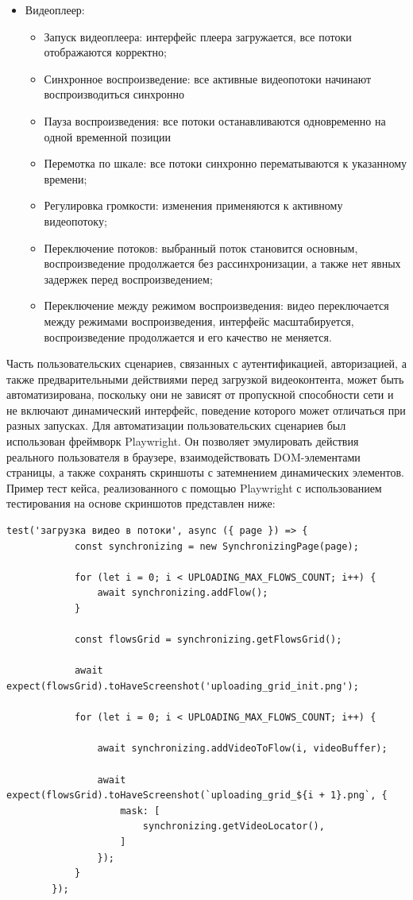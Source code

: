 \begin{itemize}[label=$\bullet$]
\begin{itemize}[label=$\circ$]
		\end{itemize}
		\item Видеоплеер:
		\begin{itemize}[label=$\circ$]
			\item Запуск видеоплеера: интерфейс плеера загружается, все потоки отображаются корректно;
			\item Синхронное воспроизведение: все активные видеопотоки начинают воспроизводиться синхронно
			\item Пауза воспроизведения: все потоки останавливаются одновременно на одной временной позиции
			\item Перемотка по шкале: все потоки синхронно перематываются к указанному времени;
			\item Регулировка громкости: изменения применяются к активному видеопотоку;
			\item Переключение потоков: выбранный поток становится основным, воспроизведение продолжается без рассинхронизации, а также нет явных задержек перед воспроизведением;
			\item Переключение между режимом воспроизведения: видео переключается между режимами воспроизведения, интерфейс масштабируется, воспроизведение продолжается и его качество не меняется.
		\end{itemize}
	\end{itemize}

	Часть пользовательских сценариев, связанных с аутентификацией, авторизацией, а также предварительными действиями перед загрузкой видеоконтента, может быть автоматизирована, поскольку они не зависят от пропускной способности сети и не включают динамический интерфейс, поведение которого может отличаться при разных запусках. Для автоматизации пользовательских сценариев был использован фреймворк Playwright. Он позволяет эмулировать действия реального пользователя в браузере, взаимодействовать DOM-элементами страницы, а также сохранять скриншоты с затемнением динамических элементов. Пример тест кейса, реализованного с помощью Playwright с использованием тестирования на основе скриншотов представлен ниже:

	\begin{lstlisting}[caption={Пример тест-кейса, реализованного с помощью Playwright}]
		test('загрузка видео в потоки', async ({ page }) => {
			const synchronizing = new SynchronizingPage(page);
			
			for (let i = 0; i < UPLOADING_MAX_FLOWS_COUNT; i++) {
				await synchronizing.addFlow();
			}
			
			const flowsGrid = synchronizing.getFlowsGrid();
			
			await expect(flowsGrid).toHaveScreenshot('uploading_grid_init.png');
			
			for (let i = 0; i < UPLOADING_MAX_FLOWS_COUNT; i++) {
				
				await synchronizing.addVideoToFlow(i, videoBuffer);
				
				await expect(flowsGrid).toHaveScreenshot(`uploading_grid_${i + 1}.png`, {
					mask: [
						synchronizing.getVideoLocator(),
					]
				});
			}
		});
	\end{lstlisting}


